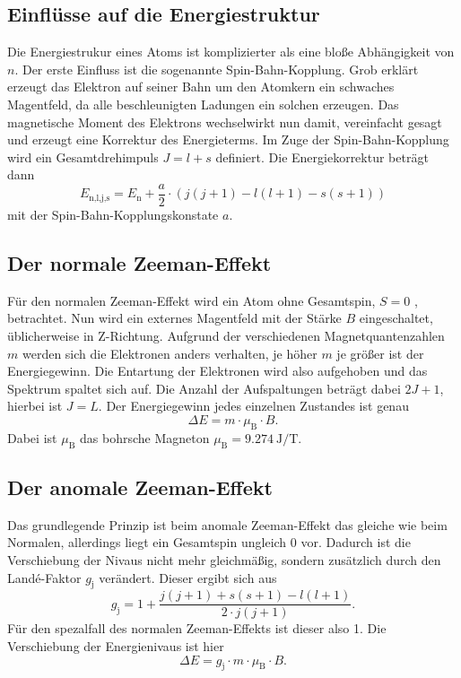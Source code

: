 \subsection{Einflüsse auf die Energiestruktur}
\label{ssec:theo2}

Die Energiestrukur eines Atoms ist komplizierter als eine bloße Abhängigkeit von $n$.
Der erste Einfluss ist die sogenannte Spin-Bahn-Kopplung.
Grob erklärt erzeugt das Elektron auf seiner Bahn um den Atomkern ein schwaches Magentfeld, da alle beschleunigten Ladungen ein solchen erzeugen.
Das magnetische Moment des Elektrons wechselwirkt nun damit, vereinfacht gesagt und erzeugt eine Korrektur des Energieterms. 
Im Zuge der Spin-Bahn-Kopplung wird ein Gesamtdrehimpuls $J = l + s$ definiert.
Die Energiekorrektur beträgt dann 
\begin{equation}
    E_\text{n,l,j,s} = E_\text{n} + \frac{a}{2} \cdot \left( j(j+1) - l(l+1) - s(s+1) \right)
   \label{eq:spinbahn}
\end{equation}
mit der Spin-Bahn-Kopplungskonstate $a$.

\subsection{Der normale Zeeman-Effekt}
\label{ssec:theo3}

Für den normalen Zeeman-Effekt wird ein Atom ohne Gesamtspin, $S = 0$ , betrachtet. 
Nun wird ein externes Magentfeld mit der Stärke $B$ eingeschaltet, üblicherweise in Z-Richtung. 
Aufgrund der verschiedenen Magnetquantenzahlen $m$ werden sich die Elektronen anders verhalten, je höher $m$ je größer ist der Energiegewinn.
Die Entartung der Elektronen wird also aufgehoben und das Spektrum spaltet sich auf.
Die Anzahl der Aufspaltungen beträgt dabei $2 J + 1$, hierbei ist $J = L$.
Der Energiegewinn jedes einzelnen Zustandes ist genau 
\begin{equation}
    \Delta E = m \cdot \mu _\text{B} \cdot B.
   \label{eq:normzeeman}
\end{equation}
Dabei ist $\mu _\text{B}$ das bohrsche Magneton $\mu _\text{B} = \SI{9.274}{\joule\per\tesla}$.

\subsection{Der anomale Zeeman-Effekt}
\label{ssec:theo4}

Das grundlegende Prinzip ist beim anomale Zeeman-Effekt das gleiche wie beim Normalen, allerdings liegt ein Gesamtspin ungleich $0$ vor.
Dadurch ist die Verschiebung der Nivaus nicht mehr gleichmäßig, sondern zusätzlich durch den Landé-Faktor $g_\text{j}$ verändert. 
Dieser ergibt sich aus 
\begin{equation}
    g_\text{j} = 1 + \frac{j(j+1) + s(s+1) - l(l+1) }{2 \cdot j(j+1)}.
   \label{eq:lande}
\end{equation}
Für den spezalfall des normalen Zeeman-Effekts ist dieser also 1.
Die Verschiebung der Energienivaus ist hier
\begin{equation}
    \Delta E = g_\text{j} \cdot m \cdot \mu _\text{B} \cdot B.
   \label{eq:anomzeeman}
\end{equation}

